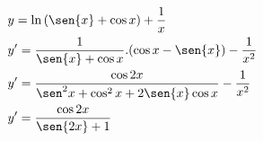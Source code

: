 \begin{ex}
\begin{align}
&y=\ln{(\sen{x}+\cos{x})}+\frac{1}{x}\nonumber\\
&y'=\frac{1}{\sen{x}+\cos{x}}.(\cos{x}-\sen{x})-\frac{1}{x^2}\nonumber\\
&y'=\frac{\cos{2x}}{\sen^2{x}+\cos^2{x}+2\sen{x}\cos{x}}-\frac{1}{x^2}\nonumber\\
&y'=\frac{\cos{2x}}{\sen{2x}+1}\nonumber
\end{align}
\end{ex}